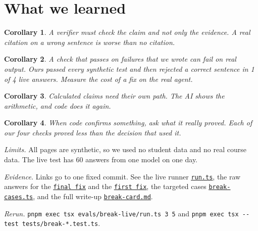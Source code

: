 \documentclass[10pt]{article}
\theoremstyle{card}
\newtheorem{corollary}{Corollary}
\newcommand{\repo}{https://github.com/benverhaalen/magic-uw/blob/9fe2f848144c6ff58830d6c5c870277833a679a3}
\newcommand{\gh}[2]{\href{\repo/#1}{\underline{\texttt{#2}}}}
\begin{document}
\begin{minipage}[t]{0.45\linewidth}
\section{What we learned}

\begin{corollary}
A verifier must check the claim and not only the evidence. A real citation on a wrong sentence is worse than no citation.
\end{corollary}
\begin{corollary}
A check that passes on failures that we wrote can fail on real output. Ours passed every synthetic test and then rejected a correct sentence in 1 of 4 live answers. Measure the cost of a fix on the real agent.
\end{corollary}
\begin{corollary}
Calculated claims need their own path. The AI shows the arithmetic, and code does it again.
\end{corollary}
\begin{corollary}
When code confirms something, ask what it really proved. Each of our four checks proved less than the decision that used it.
\end{corollary}
\vspace{3pt}
{\footnotesize
\textit{Limits.} All pages are synthetic, so we used no student data and no real course data. The live test has 60 answers from one model on one day.
\par\textit{Evidence.} Links go to one fixed commit. See the live runner \gh{evals/break-live/run.ts}{run.ts}, the raw answers for the \gh{evals/break-live/results.json}{final fix} and the \gh{evals/break-live/results-shipped-0f710ed.json}{first fix}, the targeted cases \gh{tests/break-cases.ts}{break-cases.ts}, and the full write-up \gh{docs/break-card.md}{break-card.md}.
\par\textit{Rerun.} \texttt{pnpm exec tsx evals/break-live/run.ts 3 5} and \texttt{pnpm exec tsx -{}-test tests/break-*.test.ts}.
}
\end{minipage}
\end{document}
